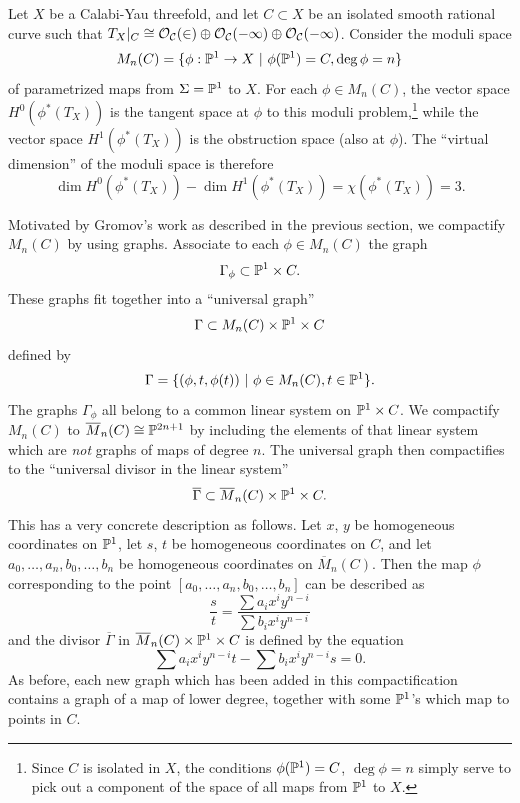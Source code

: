 Let $X$ be a Calabi-Yau threefold, and let $C \subset X$ be an isolated smooth
rational curve such that $T_X|_{C}\cong \O_C(2)\oplus\O_C(-1)\oplus\O_C(-1)$.
Consider the moduli space
\begin{equation}
M_n(C)=\{\phi:\P^1\to X\ |\ \phi(\P^1)=C, \deg\phi=n\}
\end{equation}
of parametrized maps from $\Sigma=\P^1$ to $X$.
For each $\phi\in M_n(C)$,
the vector space $H^0(\phi^*(T_X))$ is the tangent space at $\phi$
to this moduli
problem,\footnote{Since $C$ is isolated in $X$, the conditions $\phi(\P^1)=C$,
$\deg\phi=n$ simply serve to pick out a component of the space of all maps
from $\P^1$ to $X$.}
while the vector space $H^1(\phi^*(T_X))$ is the obstruction
space (also at $\phi$).  The ``virtual
dimension'' of the moduli space is therefore
\begin{equation}
\dim H^0(\phi^*(T_X)) - \dim H^1(\phi^*(T_X)) = \chi(\phi^*(T_X))=3.
\end{equation}

Motivated by Gromov's work \cite{Gro:} as described in the previous
section, we compactify $M_n(C)$ by using graphs.
Associate to each $\phi\in M_n(C)$ the graph
\begin{equation}
\Gamma_{\phi}\subset\P^1\times C.
\end{equation}
These graphs fit together into a ``universal graph''
\begin{equation}
\Gamma\subset M_n(C)\times\P^1\times C
\end{equation}
defined by
\begin{equation}
\Gamma=\{(\phi,t,\phi(t))\ |\ \phi\in M_n(C), t\in\P^1\}.
\end{equation}
The graphs $\Gamma_{\phi}$ all belong to a common linear system
on $\P^1\times C$.  We compactify $M_n(C)$ to
$\overline M_n(C)\cong\P^{2n+1}$ by
including the elements of that linear system which are {\em not} graphs
of maps of degree $n$.  The universal graph then compactifies to the
``universal divisor in the linear system''
\begin{equation}
\overline\Gamma\subset\overline M_n(C)\times\P^1\times C.
\end{equation}
This has a very concrete description as follows.  Let $x$, $y$ be
homogeneous coordinates on $\P^1$, let $s$, $t$ be homogeneous coordinates
on $C$, and let $a_0,\dots,a_n,b_0,\dots,b_n$ be homogeneous coordinates
on $\overline M_n(C)$.  Then the map $\phi$ corresponding to the
point $[a_0,\dots,a_n,b_0,\dots,b_n]$ can be described as
\begin{equation}
\frac st=\frac{\sum a_ix^iy^{n-i}}{\sum b_ix^iy^{n-i}}
\end{equation}
and the divisor $\overline\Gamma$ in
$\overline M_n(C)\times\P^1\times C$ is defined by the equation
\begin{equation} \label{eq1}
\sum a_ix^iy^{n-i}t - \sum b_ix^iy^{n-i}s=0.
\end{equation}
As before, each new graph which has been added in this compactification
contains a graph of a map of lower degree, together with some $\P^1$'s
which map to points in $C$.

